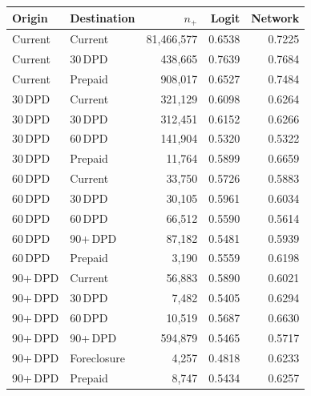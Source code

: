 \begin{tabular}{llrrr}
\toprule
Origin & Destination & $n_{+}$ & Logit & Network \\
\midrule
Current  & Current      & 81{,}466{,}577 & 0.6538 & 0.7225 \\
Current  & 30\,DPD      &    438{,}665 & 0.7639 & 0.7684 \\
Current  & Prepaid      &    908{,}017 & 0.6527 & 0.7484 \\
30\,DPD  & Current      &    321{,}129 & 0.6098 & 0.6264 \\
30\,DPD  & 30\,DPD      &    312{,}451 & 0.6152 & 0.6266 \\
30\,DPD  & 60\,DPD      &    141{,}904 & 0.5320 & 0.5322 \\
30\,DPD  & Prepaid      &     11{,}764 & 0.5899 & 0.6659 \\
60\,DPD  & Current      &     33{,}750 & 0.5726 & 0.5883 \\
60\,DPD  & 30\,DPD      &     30{,}105 & 0.5961 & 0.6034 \\
60\,DPD  & 60\,DPD      &     66{,}512 & 0.5590 & 0.5614 \\
60\,DPD  & 90+\,DPD     &     87{,}182 & 0.5481 & 0.5939 \\
60\,DPD  & Prepaid      &      3{,}190 & 0.5559 & 0.6198 \\
90+\,DPD & Current      &     56{,}883 & 0.5890 & 0.6021 \\
90+\,DPD & 30\,DPD      &      7{,}482 & 0.5405 & 0.6294 \\
90+\,DPD & 60\,DPD      &     10{,}519 & 0.5687 & 0.6630 \\
90+\,DPD & 90+\,DPD     &    594{,}879 & 0.5465 & 0.5717 \\
90+\,DPD & Foreclosure  &      4{,}257 & 0.4818 & 0.6233 \\
90+\,DPD & Prepaid      &      8{,}747 & 0.5434 & 0.6257 \\
\bottomrule
\end{tabular}
